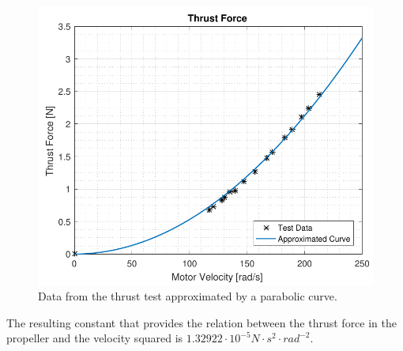 \begin{figure}[H]
	\centering
	\includegraphics[scale=0.8]{figures/ThrustGraph}
	\caption{Data from the thrust test approximated by a parabolic curve.}
	\label{ThrustGraph}
\end{figure}

The resulting constant that provides the relation between the thrust force in the propeller and the velocity squared is $1.32922\cdot10^{-5} N \cdot s^2 \cdot rad^{-2}$.
